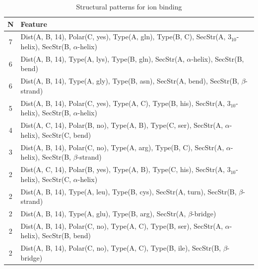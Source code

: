 \documentclass[11pt,twoside,a4paper]{book}
\begin{document}
\begin{table}\begin{tabularx}{\textwidth}{cX}\textbf{N} & \textbf{Feature} \\ \hline  
7 & Dist(A, B, 14), Polar(C, yes),  Type(A, gln), Type(B, C), SecStr(A, $3_{10}$-helix), \newline SecStr(B, $\alpha$-helix)\\ \hline 
6 & Dist(A, B, 14),  Type(A, lys), Type(B, gln), SecStr(A, $\alpha$-helix), SecStr(B, bend)\\ \hline 
6 & Dist(A, B, 14),  Type(A, gly), Type(B, asn), SecStr(A, bend), SecStr(B, $\beta$-strand)\\ \hline 
5 & Dist(A, B, 14), Polar(C, yes),  Type(A, C), Type(B, his), SecStr(A, $3_{10}$-helix), \newline SecStr(B, $\alpha$-helix)\\ \hline 
4 & Dist(A, C, 14), Polar(B, no),  Type(A, B), Type(C, ser), SecStr(A, $\alpha$-helix), \newline SecStr(C, bend)\\ \hline 
3 & Dist(A, B, 14), Polar(C, no),  Type(A, arg), Type(B, C), SecStr(A, $\alpha$-helix), \newline SecStr(B, $\beta$-strand)\\ \hline 
2 & Dist(A, C, 14), Polar(B, yes),  Type(A, B), Type(C, his), SecStr(A, $3_{10}$-helix), \newline SecStr(C, $\alpha$-helix)\\ \hline 
2 & Dist(A, B, 14),  Type(A, leu), Type(B, cys), SecStr(A, turn), SecStr(B, $\beta$-strand)\\ \hline 
2 & Dist(A, B, 14),  Type(A, glu), Type(B, arg), SecStr(A, $\beta$-bridge)\\ \hline 
2 & Dist(A, B, 14), Polar(C, no),  Type(A, C), Type(B, ser), SecStr(A, $\alpha$-helix), \newline SecStr(B, bend)\\ \hline 
2 & Dist(A, B, 14), Polar(C, no),  Type(A, C), Type(B, ile), SecStr(B, $\beta$-bridge)\\ \hline 
 \end{tabularx}\caption{Structural patterns for ion binding}\label{tab:ion_binding}\end{table}
\end{document}
